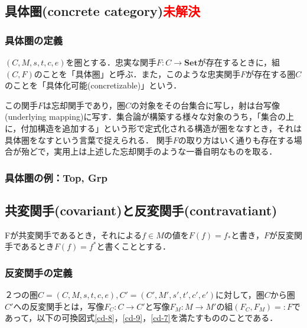 \documentclass[uplatex, 12pt, a4paper, dvipdfmx]{jsarticle}
\begin{document}
\subsection{具体圏(concrete category)\textcolor{red}{未解決}}

\subsubsection{具体圏の定義}
\begin{shadebox}\begin{definition}[具体圏]
    $(C,M,s,t,c,e)$を圏とする．忠実な関手$F:C\longrightarrow \mathbf{Set}$が存在するときに，組$(C,F)$のことを「具体圏」と呼ぶ．また，このような忠実関手$F$が存在する圏$C$のことを「具体化可能(concretizable)」という．
\end{definition}\end{shadebox}
この関手$F$は忘却関手であり，圏$C$の対象をその台集合に写し，射は台写像(underlying mapping)に写す．集合論が構築する様々な対象のうち，「集合の上に，付加構造を追加する」という形で定式化される構造が圏をなすとき，それは具体圏をなすという言葉で捉えられる．
関手$F$の取り方はいく通りも存在する場合が殆どで，実用上は上述した忘却関手のような一番自明なものを取る．

\subsubsection{具体圏の例：\textbf{Top, Grp}}

\subsection{共変関手(covariant)と反変関手(contravatiant)}
Fが共変関手であるとき，それによる$f\in M$の値を$F(f)=f_*$と書き，$F$が反変関手であるとき$F(f)=f^*$と書くこととする．

\subsubsection{反変関手の定義}

\begin{shadebox}\begin{definition}[（反変）関手]
    ２つの圏$C=(C,M,s,t,c,e),C'=(C',M',s',t',c',e')$に対して，圏$C$から圏$C'$への反変関手とは，写像$F_C:C\longrightarrow C'$と写像$F_M:M\longrightarrow M'$の組$(F_C,F_M)=:F$であって，以下の可換図式\ref{cd-8}，\ref{cd-9}，\ref{cd-7}を満たすもののことである．
\end{definition}\end{shadebox}
\end{document}
